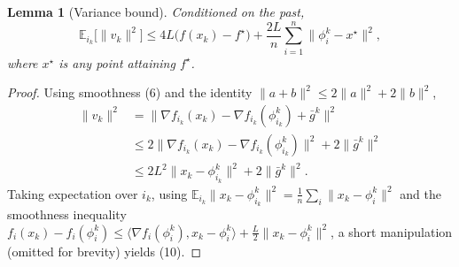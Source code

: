 \documentclass{article}
\newtheorem{lemma}{Lemma}
\begin{document}
\begin{lemma}[Variance bound]\label{lem:var}
Conditioned on the past,
\[
\mathbb{E}_{i_k}\big[\|v_k\|^{2}\big]
\le 4L\big(f(x_k)-f^{\star}\big)
      +\frac{2L}{n}\sum_{i=1}^{n}\big\|\phi_i^k-x^{\star}\big\|^{2},
\tag{10}
\]
where $x^{\star}$ is any point attaining $f^{\star}$.
\end{lemma}
\begin{proof}
Using smoothness (6) and the identity
$\|a+b\|^{2}\le 2\|a\|^{2}+2\|b\|^{2}$,
\[
\begin{aligned}
\|v_k\|^{2}
&=\big\|\nabla f_{i_k}(x_k)-\nabla f_{i_k}(\phi_{i_k}^k)+\bar g^k\big\|^{2}\\
&\le 2\big\|\nabla f_{i_k}(x_k)-\nabla f_{i_k}(\phi_{i_k}^k)\big\|^{2}
   +2\|\bar g^k\|^{2}\\
&\le 2L^{2}\|x_k-\phi_{i_k}^k\|^{2}+2\|\bar g^k\|^{2}.
\end{aligned}
\]
Taking expectation over $i_k$, using $\mathbb{E}_{i_k}\|x_k-\phi_{i_k}^k\|^{2}
=\frac1n\sum_{i}\|x_k-\phi_i^k\|^{2}$ and the smoothness inequality
$f_i(x_k)-f_i(\phi_i^k)\le\langle\nabla f_i(\phi_i^k),x_k-\phi_i^k\rangle
+\frac{L}{2}\|x_k-\phi_i^k\|^{2}$, a short manipulation (omitted for brevity)
yields (10). \hfill\qedsymbol
\end{proof}
\end{document}
